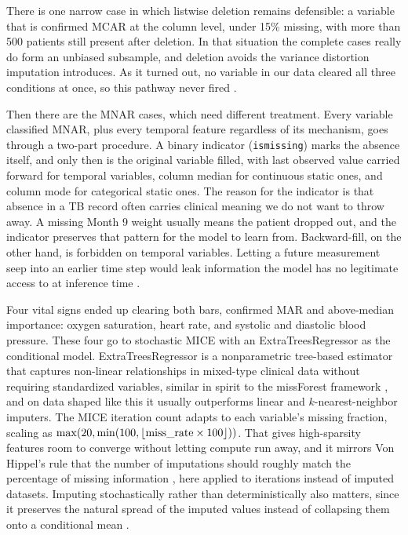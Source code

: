 \documentclass[12pt]{article}
\renewcommand{\_}{\textunderscore\allowbreak}
\begin{document}
There is one narrow case in which listwise deletion remains defensible: a variable that is confirmed MCAR at the column level, under 15\% missing, with more than 500 patients still present after deletion. In that situation the complete cases really do form an unbiased subsample, and deletion avoids the variance distortion imputation introduces. As it turned out, no variable in our data cleared all three conditions at once, so this pathway never fired \citep{ref32}.

Then there are the MNAR cases, which need different treatment. Every variable classified MNAR, plus every temporal feature regardless of its mechanism, goes through a two-part procedure. A binary indicator (\texttt{is\_missing\_[variable]}) marks the absence itself, and only then is the original variable filled, with last observed value carried forward for temporal variables, column median for continuous static ones, and column mode for categorical static ones. The reason for the indicator is that absence in a TB record often carries clinical meaning we do not want to throw away. A missing Month 9 weight usually means the patient dropped out, and the indicator preserves that pattern for the model to learn from. Backward-fill, on the other hand, is forbidden on temporal variables. Letting a future measurement seep into an earlier time step would leak information the model has no legitimate access to at inference time \citep{ref34, ref36, ref33}.

Four vital signs ended up clearing both bars, confirmed MAR and above-median importance: oxygen saturation, heart rate, and systolic and diastolic blood pressure. These four go to stochastic MICE with an ExtraTreesRegressor as the conditional model. ExtraTreesRegressor is a nonparametric tree-based estimator that captures non-linear relationships in mixed-type clinical data without requiring standardized variables, similar in spirit to the missForest framework \citep{ref35}, and on data shaped like this it usually outperforms linear and $k$-nearest-neighbor imputers. The MICE iteration count adapts to each variable's missing fraction, scaling as $\max(20, \min(100, \lfloor \text{miss\_rate} \times 100 \rfloor))$. That gives high-sparsity features room to converge without letting compute run away, and it mirrors Von Hippel's rule that the number of imputations should roughly match the percentage of missing information \citep{ref38}, here applied to iterations instead of imputed datasets. Imputing stochastically rather than deterministically also matters, since it preserves the natural spread of the imputed values instead of collapsing them onto a conditional mean \citep{ref1}.
\end{document}
